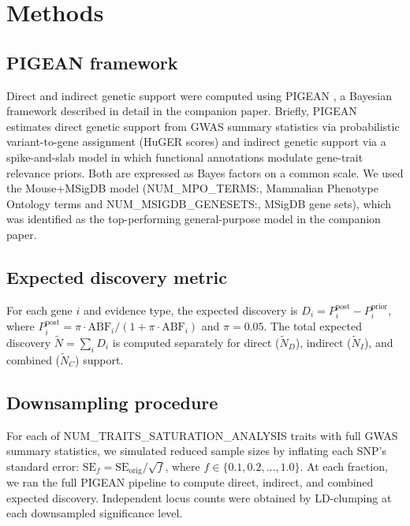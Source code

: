 \section{Methods}\label{sec:letter-methods}

\subsection{PIGEAN framework}
Direct and indirect genetic support were computed using PIGEAN \cite{}, a Bayesian framework described in detail in the companion paper. Briefly, PIGEAN estimates direct genetic support from GWAS summary statistics via probabilistic variant-to-gene assignment (HuGER scores) and indirect genetic support via a spike-and-slab model in which functional annotations modulate gene-trait relevance priors. Both are expressed as Bayes factors on a common scale. We used the Mouse+MSigDB model ({{NUM_MPO_TERMS:,}} Mammalian Phenotype Ontology terms and {{NUM_MSIGDB_GENESETS:,}} MSigDB gene sets), which was identified as the top-performing general-purpose model in the companion paper.

\subsection{Expected discovery metric}
For each gene $i$ and evidence type, the expected discovery is $D_i = P_i^{\text{post}} - P_i^{\text{prior}}$, where $P_i^{\text{post}} = \pi \cdot \text{ABF}_i / (1 + \pi \cdot \text{ABF}_i)$ and $\pi = 0.05$. The total expected discovery $\tilde{N} = \sum_i D_i$ is computed separately for direct ($\tilde{N}_D$), indirect ($\tilde{N}_I$), and combined ($\tilde{N}_C$) support.

\subsection{Downsampling procedure}
For each of {{NUM_TRAITS_SATURATION_ANALYSIS}} traits with full GWAS summary statistics, we simulated reduced sample sizes by inflating each SNP's standard error: $\text{SE}_f = \text{SE}_{\text{orig}} / \sqrt{f}$, where $f \in \{0.1, 0.2, \ldots, 1.0\}$. At each fraction, we ran the full PIGEAN pipeline to compute direct, indirect, and combined expected discovery. Independent locus counts were obtained by LD-clumping at each downsampled significance level.

